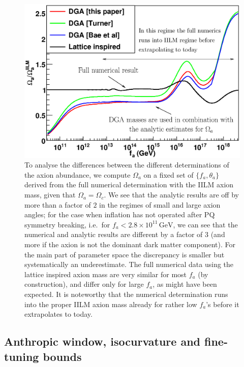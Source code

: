\documentclass[preprint,nofootinbib]{revtex4}
\newcommand{\units}[1]{\, \mathrm{#1}}
\begin{document}
\begin{figure}[tbp]
\begin{center}
\includegraphics[width=\figwidth,clip=true,trim=0mm 0mm 15mm 10mm]{OmegaFa.eps}
\caption{To analyse the differences between the different determinations of the axion abundance, we compute $\Omega_a$ on a fixed set of $\{f_a,\theta_a\}$ derived from the full numerical determination with the IILM axion mass, given that $\Omega_a=\Omega_c$. We see that the analytic results are off by more than a factor of $2$ in the regimes of small and large axion angles; for the case when inflation has not operated after PQ symmetry breaking, i.e.\ for $f_a<2.8\times10^{11}\units{GeV}$, we can see that the numerical and analytic results are different by a factor of $3$ (and more if the axion is not the dominant dark matter component). For the main part of parameter space the discrepancy is smaller but systematically an underestimate. The full numerical data using the lattice inspired axion mass are very similar for most $f_a$ (by construction), and differ only for large $f_a$, as might have been expected. It is noteworthy that the numerical determination runs into the proper IILM axion mass already for rather low $f_a$'s before it extrapolates to today.}
\label{fig:OmegaFa}
\end{center}
\end{figure}

\subsection{Anthropic window, isocurvature and fine-tuning bounds}
\end{document}
